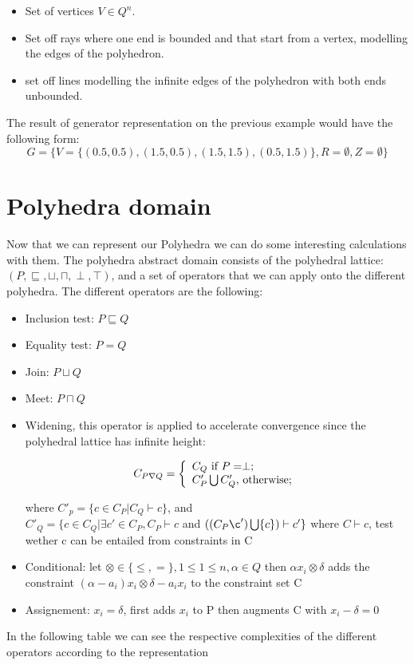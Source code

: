 \begin{itemize}
	\item Set of vertices $V\in Q^n$.
	\item Set off rays where one end is bounded and that start from a vertex, modelling the edges of the polyhedron. 
	\item set off lines modelling the infinite edges of the polyhedron with both ends unbounded.
\end{itemize}
The result of generator representation on the previous example would have the following form: 
\begin{equation}
	G = \{ V = \{(0.5,0.5),(1.5,0.5),(1.5,1.5),(0.5,1.5)\}, R = \emptyset, Z = \emptyset \}
\end{equation}
\section{Polyhedra domain}

Now that we can represent our Polyhedra we can do some interesting calculations with them. The polyhedra abstract domain consists of the polyhedral lattice:
	$(P,\sqsubseteq,\sqcup,\sqcap,\perp,\top)$, and a set of operators that we can apply onto the different polyhedra. The different operators are the following:
	\begin{itemize}
		\item Inclusion test: $P \sqsubseteq Q$
		\item Equality test: $P=Q$
		\item Join: $P\sqcup Q$
		\item Meet: $P\sqcap Q$
		\item Widening, this operator is applied to accelerate convergence since the polyhedral lattice has infinite height:
		\begin{center}
		  \[
    C_{P\nabla Q}=\left\{
                \begin{array}{ll}
                  C_Q $ if $P=\perp ;\\
                  C'_P\bigcup C'_Q, $ otherwise$;
                \end{array}
              \right.
  	\]
		
		\end{center}

		where $C'_p=\{c\in C_P |C_Q \vdash c \}$, and\\  $C'_Q=\{c\in C_Q |\exists c' \in C_P,C_P \vdash c $ and $((C_P\c')\bigcup \{c\})\vdash c' \}$
		where $C\vdash c$, test wether c can be entailed from constraints in C
		\item Conditional: let $\otimes \in \{\leq,=\},1\leq 1\leq n,\alpha \in Q$ then $\alpha x_i \otimes \delta$ adds the constraint $(\alpha-a_i)x_i \otimes\delta - a_i x_i$ to the constraint set C
		\item Assignement: $x_i = \delta$, first adds $x_i$ to P then augments C with $x_i -\delta = 0$
		
	\end{itemize}
	 In the following table we can see the respective complexities of the different operators according to the representation
	 
